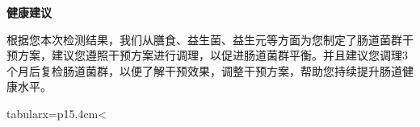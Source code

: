 




\vspace*{3mm}
\setlength{\arrayrulewidth}{0.5pt}
\fontsize{9.3pt}{17pt}\selectfont
\color{gray2}

\begin{center}
{\bf\sanhao 健康建议}
\end{center}

\begin{spacing}{1.25}
\bigskip
\noindent
根据您本次检测结果，我们从膳食、益生菌、益生元等方面为您制定了肠道菌群干预方案，建议您遵照干预方案进行调理，以促进肠道菌群平衡。并且建议您调理3个月后复检肠道菌群，以便了解干预效果，调整干预方案，帮助您持续提升肠道健康水平。

\bigskip
\tabcolsep=6pt
\fontsize{9.3pt}{9.8pt}\selectfont
\begin{tctabularx}{tabularx={p{15.4cm}<{\centering}}}
\\[-6.769pt]
  \\
\end{tctabularx}


\end{spacing}

